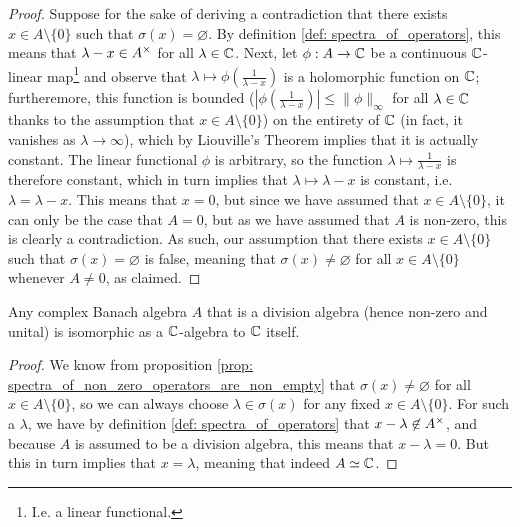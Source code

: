                 \begin{proof}
                    Suppose for the sake of deriving a contradiction that there exists $x \in A \setminus \{0\}$ such that $\sigma(x) = \varnothing$. By definition \ref{def: spectra_of_operators}, this means that $\lambda - x \in A^{\x}$ for all $\lambda \in \mathbb{C}$. Next, let $\phi: A \to \mathbb{C}$ be a continuous $\mathbb{C}$-linear map\footnote{I.e. a linear functional.} and observe that $\lambda \mapsto \phi\left(\frac{1}{\lambda - x}\right)$ is a holomorphic function on $\mathbb{C}$; furtheremore, this function is bounded ($\left|\phi\left(\frac{1}{\lambda - x}\right)\right| \leq \|\phi\|_{\infty}$ for all $\lambda \in \mathbb{C}$ thanks to the assumption that $x \in A \setminus \{0\}$) on the entirety of $\mathbb{C}$ (in fact, it vanishes as $\lambda \to \infty$), which by Liouville's Theorem implies that it is actually constant. The linear functional $\phi$ is arbitrary, so the function $\lambda \mapsto \frac{1}{\lambda - x}$ is therefore constant, which in turn implies that $\lambda \mapsto \lambda - x$ is constant, i.e. $\lambda = \lambda - x$. This means that $x = 0$, but since we have assumed that $x \in A \setminus \{0\}$, it can only be the case that $A = 0$, but as we have assumed that $A$ is non-zero, this is clearly a contradiction. As such, our assumption that there exists $x \in A \setminus \{0\}$ such that $\sigma(x) = \varnothing$ is false, meaning that $\sigma(x) \not = \varnothing$ for all $x \in A \setminus \{0\}$ whenever $A \not = 0$, as claimed.
                \end{proof}
            \begin{corollary} \label{coro: banach_division_algebras_are_isomorphic_to_ground_field}
                Any complex Banach algebra $A$ that is a division algebra (hence non-zero and unital) is isomorphic as a $\mathbb{C}$-algebra to $\mathbb{C}$ itself.
            \end{corollary}
                \begin{proof}
                    We know from proposition \ref{prop: spectra_of_non_zero_operators_are_non_empty} that $\sigma(x) \not = \varnothing$ for all $x \in A \setminus \{0\}$, so we can always choose $\lambda \in \sigma(x)$ for any fixed $x \in A \setminus \{0\}$. For such a $\lambda$, we have by definition \ref{def: spectra_of_operators} that $x - \lambda \not \in A^{\x}$, and because $A$ is assumed to be a division algebra, this means that $x - \lambda = 0$. But this in turn implies that $x = \lambda$, meaning that indeed $A \simeq \mathbb{C}$.
                \end{proof}

